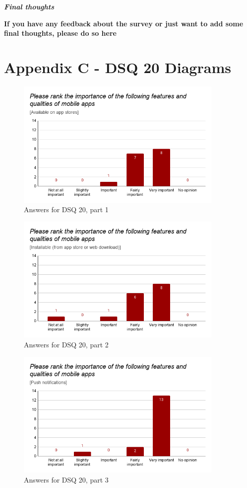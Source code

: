\documentclass[a4paper,12pt]{article}
\begin{document}
\quad

\quad 

\textbf{\textit{Final thoughts}}

\textbf{If you have any feedback about the survey or just want to add some final thoughts, please do so here}

\newpage
\section{Appendix C - DSQ 20 Diagrams}
\label{Appendix_devMultiDiagrams}

\begin{figure}[ht!]
    \centering
    \includegraphics[width=10cm]{img/Results/dsq20_1.png}
    \caption{Answers for DSQ 20, part 1}
    \label{fig:res_devq20_1}
\end{figure}

\begin{figure}[ht!]
    \centering
    \includegraphics[width=10cm]{img/Results/dsq20_2.png}
    \caption{Answers for DSQ 20, part 2}
    \label{fig:res_devq20_2}
\end{figure}

\begin{figure}[ht!]
    \centering
    \includegraphics[width=10cm]{img/Results/dsq20_3.png}
    \caption{Answers for DSQ 20, part 3}
    \label{fig:res_devq20_3}
\end{figure}
\newpage
\end{document}
